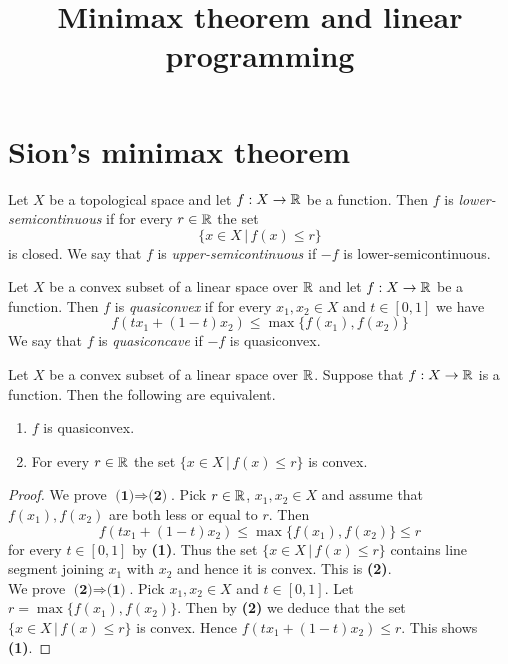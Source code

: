 



\title{Minimax theorem and linear programming}
\date{}
\maketitle

\section{Sion's minimax theorem}

\begin{definition}
Let $X$ be a topological space and let $f:X \rightarrow {\mathbb R}$ be a function. Then $f$ is \textit{lower-semicontinuous} if for every $r \in {\mathbb R}$ the set
$$\{x\in X\,|\,f(x) \leq r \}$$
is closed. We say that $f$ is \textit{upper-semicontinuous} if $-f$ is lower-semicontinuous.
\end{definition}

\begin{definition}
Let $X$ be a convex subset of a linear space over ${\mathbb R}$ and let $f:X \rightarrow {\mathbb R}$ be a function. Then $f$ is \textit{quasiconvex} if for every $x_1, x_2\in X$ and $t\in [0,1]$ we have
$$f\left(tx_1 + (1-t)x_2\right) \leq \max\big\{f(x_1),f(x_2)\big\}$$
We say that $f$ is \textit{quasiconcave} if $-f$ is quasiconvex.
\end{definition}

\begin{proposition}\label{proposition:characterizationofquasiconvexity}
Let $X$ be a convex subset of a linear space over ${\mathbb R}$. Suppose that $f:X \rightarrow {\mathbb R}$ is a function. Then the following are equivalent.
\begin{enumerate}[label=\emph{\textbf{(\arabic*)}}, leftmargin=1.5em]
\item $f$ is quasiconvex.
\item For every $r \in {\mathbb R}$ the set $\{x\in X\,|\,f(x)\leq r\}$ is convex.
\end{enumerate}
\end{proposition}
\begin{proof}
We prove $\textbf{(1)}\Rightarrow \textbf{(2)}$. Pick $r \in {\mathbb R}$, $x_1,x_2\in X$ and assume that $f(x_1), f(x_2)$ are both less or equal to $r$. Then
$$f\left(tx_1 + (1-t)x_2\right) \leq \max\big\{f(x_1),f(x_2)\big\} \leq r$$
for every $t\in [0,1]$ by \textbf{(1)}. Thus the set $\{x\in X\,|\,f(x)\leq r\}$ contains line segment joining $x_1$ with $x_2$ and hence it is convex. This is \textbf{(2)}.\\
We prove $\textbf{(2)}\Rightarrow \textbf{(1)}$. Pick $x_1,x_2\in X$ and $t\in [0,1]$. Let $r = \max\big\{f(x_1), f(x_2)\big\}$. Then by \textbf{(2)} we deduce that the set $\{x\in X\,|\,f(x)\leq r\}$ is convex. Hence $f\left(tx_1 + (1-t)x_2\right)\leq r$. This shows \textbf{(1)}.
\end{proof}

